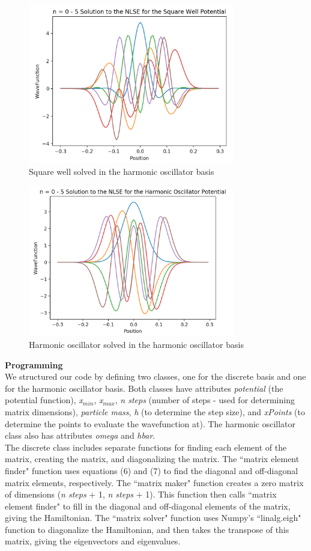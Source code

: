 \documentclass[%
 reprint,
 amsmath,amssymb,
 aps,
]{revtex4-1}
\begin{document}
\begin{figure}
\includegraphics[width=9cm]{HOBasisSquareWell}
\caption{Square well solved in the harmonic oscillator basis}
\end{figure}
\begin{figure}
\includegraphics[width=9cm]{HOBasisHarmonicOscillator}
\caption{Harmonic oscillator solved in the harmonic oscillator basis}
\end{figure}

\noindent \textbf{Programming}\\

\noindent We structured our code by defining two classes, one for the discrete basis and one for the harmonic oscillator basis.  Both classes have attributes \textit{potential} (the potential function), \textit{x}$_{min}$, \textit{x}$_{max}$, \textit{n steps} (number of steps - used for determining matrix dimensions), \textit{particle mass}, \textit{h} (to determine the step size), and \textit{xPoints} (to determine the points to evaluate the wavefunction at).  The harmonic oscillator class also has attributes \textit{omega} and \textit{hbar}.\\

\noindent The discrete class includes separate functions for finding each element of the matrix, creating the matrix, and diagonalizing the matrix.  The ``matrix element finder" function uses equations (6) and (7) to find the diagonal and off-diagonal matrix elements, respectively.  The ``matrix maker" function creates a zero matrix of dimensions (\textit{n steps} + 1, \textit{n steps} + 1).  This function then calls ``matrix element finder" to fill in the diagonal and off-diagonal elements of the matrix, giving the Hamiltonian.  The ``matrix solver" function uses Numpy's ``linalg.eigh" function to diagonalize the Hamiltonian, and then takes the transpose of this matrix, giving the eigenvectors and eigenvalues.\\
\end{document}

